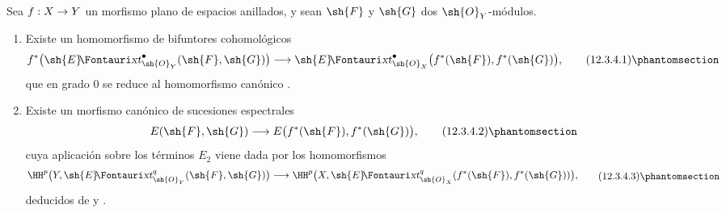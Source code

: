 \documentclass[oneside]{amsart}
\makeatletter
\newcommand{\ega@arrow}[2]{\mathchoice{#1}{#2}{#2}{#2}}
\renewcommand{\to}{\ega@arrow{\longrightarrow}{\rightarrow}}
\newcommand*{\ega@sheafop}[3]{\sh{#1}#2\textup{\kern-2.2pt{\Fontauri\slshape #3}}}
\newcommand*{\shExt}{\ega@sheafop{E}{}{xt}}
\newcommand{\oldpage}[2][]{{\marginnote{\normalfont\textbf{#1}~|~#2}}\ignorespaces}
\let\EGAOriginalLabel\label
\renewcommand{\label}[1]{\phantomsection\EGAOriginalLabel{#1}}
\makeatother
\begin{document}
\oldpage[0\textsubscript{III}]{61}
\begin{proposition}[12.3.4]
\label{0.12.3.4}
Sea $f:X\to Y$ un morfismo \textup{plano} de espacios anillados, y sean
$\sh{F}$ y $\sh{G}$ dos $\sh{O}_Y$-módulos.
\begin{enumerate}
  \item[\rm(i)] Existe un homomorfismo de bifuntores cohomológicos
  \[
    f^*\bigl(\shExt^\bullet_{\sh{O}_Y}(\sh{F},\sh{G})\bigr)
    \longrightarrow
    \shExt^\bullet_{\sh{O}_X}
      \bigl(f^*(\sh{F}),f^*(\sh{G})\bigr),
    \tag{12.3.4.1}
    \label{0.12.3.4.1}
  \]
  que en grado $0$ se reduce al homomorfismo canónico
  .

  \item[\rm(ii)] Existe un morfismo canónico de sucesiones espectrales
  \[
    E(\sh{F},\sh{G})
    \longrightarrow E\bigl(f^*(\sh{F}),f^*(\sh{G})\bigr),
    \tag{12.3.4.2}
    \label{0.12.3.4.2}
  \]
  cuya aplicación sobre los términos $E_2$ viene dada por los homomorfismos
  \[
    \begin{aligned}
    \HH^p\bigl(Y,\shExt^q_{\sh{O}_Y}(\sh{F},\sh{G})\bigr)
    \longrightarrow
    \HH^p\bigl(X,\shExt^q_{\sh{O}_X}
      (f^*(\sh{F}),f^*(\sh{G}))\bigr),
    \end{aligned}
    \tag{12.3.4.3}
    \label{0.12.3.4.3}
  \]
  deducidos de  y .
\end{enumerate}
\end{proposition}
\end{document}

